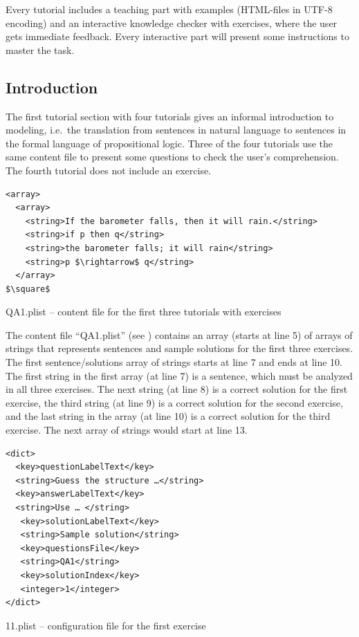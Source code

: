 Every tutorial includes a teaching part with examples (HTML-files in UTF-8 encoding) 
and an interactive knowledge checker with exercises, 
where the user gets immediate feedback. 
Every interactive part will present some instructions to master the task.

\subsection{Introduction}

The first tutorial section with four tutorials gives an informal introduction to modeling, 
i.e.\ the translation from sentences in natural language to sentences in the formal language of propositional logic.
Three of the four tutorials
use the same content file to present some questions
to check the user's comprehension. 
The fourth tutorial does not include an exercise.

\begin{table}[htdp]
\begin{center}
\begin{lstlisting}[firstnumber=5]
<array>
  <array> 
    <string>If the barometer falls, then it will rain.</string>
    <string>if p then q</string>
    <string>the barometer falls; it will rain</string>
    <string>p $\rightarrow$ q</string>
  </array>
$\square$
\end{lstlisting}
\caption{QA1.plist – content file for the first three tutorials with exercises}
\label{tab:QA1PLIST}
\end{center}
\end{table}%

The content file “QA1.plist” (see ) contains
an array (starts at line 5) 
of arrays of strings that represents sentences and sample solutions for the 
first three exercises.
The first sentence/solutions array of strings starts at line 7 and ends at line 10. 
The first string in the first array (at line 7) is a sentence, 
which must be analyzed in all three exercises. 
The next string (at line 8) is a correct solution for the first exercise,
the third string (at line 9) is a correct solution for the second exercise,
and the last string in the array (at line 10) is a correct solution for the third exercise.  
The next array of strings would start at line 13.

\begin{table}[htdp]
\begin{center}
\begin{lstlisting}[firstnumber=5]
<dict>
  <key>questionLabelText</key>
  <string>Guess the structure …</string>
  <key>answerLabelText</key>
  <string>Use … </string>
   <key>solutionLabelText</key>
   <string>Sample solution</string>
   <key>questionsFile</key>
   <string>QA1</string>
   <key>solutionIndex</key>
   <integer>1</integer>
</dict>
\end{lstlisting}
\caption{11.plist – configuration file for the first exercise}
\label{tab:11PLIST}
\end{center}
\end{table}

